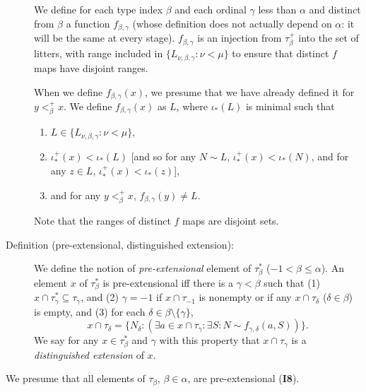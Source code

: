 \documentclass[112pt]{article}
\begin{document}
\begin{description}
We define for each type index $\beta$ and each ordinal $\gamma$ less than $\alpha$ and distinct from $\beta$ a function $f_{\beta,\gamma}$ (whose definition does not actually depend on $\alpha$:  it will be the same at every stage).  $f_{\beta,\gamma}$ is an injection from $\tau_\beta^+$ into the set of litters, with range included in \newline $\{L_{\nu,\beta,\gamma}:\nu < \mu\}$ to ensure that distinct $f$ maps have disjoint ranges.


 When we define $f_{\beta,\gamma}(x)$, we presume that we have already defined it for $y <^+_\beta x$.
We define $f_{\beta,\gamma}(x)$ as $L$, where $\iota_*(L)$ is minimal such that 

\begin{enumerate}
\item $L \in  \{L_{\nu,\beta,\gamma}:\nu < \mu\}$, 

\item  $\iota^+_*(x) <\iota_*(L)$ [and so for any $N \sim L$, $\iota^+_*(x) <\iota_*(N)$, and for any $z \in L$, $\iota^+_*(x) < \iota_*(z)$], 

\item and for any $y<_\beta^+ x$, $f_{\beta,\gamma}(y) \neq L$.

\end{enumerate}

Note that the ranges of distinct $f$ maps are disjoint sets.



\item[Definition (pre-extensional, distinguished extension):]  We define the notion of {\em pre-extensional\/} element of $\tau^*_\beta$ ($-1 <\beta \leq \alpha$).   An element $x$ of $\tau^*_\beta$ is pre-extensional iff there is a $\gamma<\beta$ such that (1) $x \cap \tau^*_\gamma \subseteq \tau_\gamma$, and (2) $\gamma=-1$ if
$x \cap \tau_{-1}$ is nonempty or if any $x \cap \tau_\delta$ ($\delta \in \beta$) is empty,  and (3) for each $\delta \in \beta \setminus \{\gamma\}$, $$x \cap \tau_\delta= \{N_\delta:(\exists a \in x\cap \tau_\gamma:\exists S:N \sim f_{\gamma,\delta}(a,S))\}.$$  We say for any $x \in \tau^*_\beta$ and $\gamma$ with this property that $x \cap \tau_\gamma$ is a {\em distinguished extension\/} of $x$.

\end{description}

We presume that all elements of $\tau_\beta$, $\beta\in \alpha$, are pre-extensional ({\bf I8}). 
\end{document}

